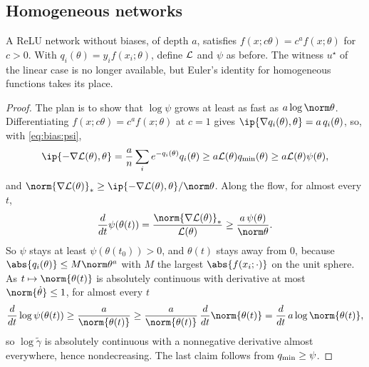 \begin{refsection}
\subsection{Homogeneous networks}

A ReLU network without biases, of depth $a$, satisfies $f(x;c\theta)=c^af(x;\theta)$ for $c>0$. With $q_i(\theta)=y_if(x_i;\theta)$, define $\mathcal{L}$ and $\psi$ as before. The witness $u^\star$ of the linear case is no longer available, but Euler's identity for homogeneous functions takes its place.


\begin{proof}
The plan is to show that $\log\psi$ grows at least as fast as $a\log\norm\theta$. Differentiating $f(x;c\theta)=c^af(x;\theta)$ at $c=1$ gives $\ip{\nabla q_i(\theta),\theta}=a\,q_i(\theta)$, so, with \eqref{eq:bias:psi},
\[
  \ip{-\nabla\Loss(\theta),\theta}=\frac an\sum_ie^{-q_i(\theta)}q_i(\theta)\ge a\Loss(\theta)\biasqmin(\theta)\ge a\Loss(\theta)\psi(\theta),
\]
and $\norm{\nabla\Loss(\theta)}_*\ge\ip{-\nabla\Loss(\theta),\theta}/\norm\theta$. Along the flow, for almost every $t$,
\[
  \frac{d}{dt}\psi(\theta(t))=\frac{\norm{\nabla\Loss(\theta)}_*}{\Loss(\theta)}\ge\frac{a\,\psi(\theta)}{\norm\theta}.
\]
So $\psi$ stays at least $\psi(\theta(t_0))>0$, and $\theta(t)$ stays away from $0$, because $\abs{q_i(\theta)}\le M\norm\theta^a$ with $M$ the largest $\abs{f(x_i;\cdot)}$ on the unit sphere. As $t\mapsto\norm{\theta(t)}$ is absolutely continuous with derivative at most $\norm{\dot\theta}\le1$, for almost every $t$
\[
  \frac{d}{dt}\log\psi(\theta(t))\ge\frac a{\norm{\theta(t)}}\ge\frac a{\norm{\theta(t)}}\,\frac{d}{dt}\norm{\theta(t)}=\frac{d}{dt}\,a\log\norm{\theta(t)},
\]
so $\log\tilde\gamma$ is absolutely continuous with a nonnegative derivative almost everywhere, hence nondecreasing. The last claim follows from $q_{\min}\ge\psi$.
\end{proof}


\end{refsection}
